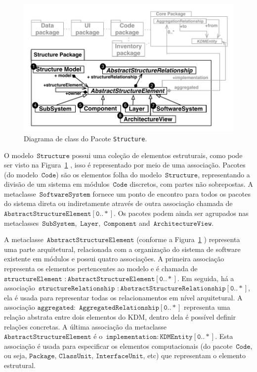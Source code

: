 \documentclass[12pt]{article}
\begin{document}
\begin{figure}[htb]
 \centering
 \includegraphics[scale=0.8]{StructurePackageFigure.pdf}
 \caption{Diagrama de class do Pacote \texttt{Structure}.}
 \label{fig:structureModel}
\end{figure}

O modelo~$\mathtt{Structure}$ possui uma coleção de elementos estruturais, como pode ser visto na Figura~\ref{fig:structureModel} , isso é representado por meio de uma associação. Pacotes (do modelo~$\mathtt{Code}$) são os elementos folha do modelo~$\mathtt{Structure}$, representando a divisão de um sistema em módulos~$\mathtt{Code}$ discretos, com partes não sobrepostas. A metaclasse~$\mathtt{SoftwareSystem}$ fornece um ponto de encontro para todos os pacotes do sistema direta ou indiretamente através de outra associação chamada de~$\mathtt{AbstractStructureElement[0..*]}$. Os pacotes podem ainda ser agrupados nas metaclasses~$\mathtt{SubSystem}$,~$\mathtt{Layer}$,~$\mathtt{Component}$ and~$\mathtt{ArchitectureView}$.

A metaclasse~$\mathtt{AbstractStructureElement}$ (conforme a Figura~\ref{fig:structureModel} ) representa uma parte arquitetural, relacionada com a organização do sistema de software existente em módulos e possui quatro associações. A primeira associação representa os elementos pertencentes ao modelo e é chamada de $\mathtt{structureElement}$ $\mathtt{:AbstractStructureElement[0..*]}$. Em seguida, há a associação~$\mathtt{structureRelationship}$ $\mathtt{:AbstractStructureRelationship[0..*]}$, ela é usada para representar todas os relacionamentos em nível arquitetural. A associação $\mathtt{aggregated:}$ $\mathtt{AggregatedRelationship[0..*]}$ representa uma relação abstrata entre dois elementos do KDM, dentro dela é possível definir relações concretas. A última associação da metaclasse~$\mathtt{AbstractStructureElement}$ é o~$\mathtt{implementation:KDMEntity[0..*]}$. Esta associação é usada para especificar os elementos computacionais (do pacote~$\mathtt{Code}$, ou seja, $\mathtt{Package}$, $\mathtt{ClassUnit}$, $\mathtt{InterfaceUnit}$, etc) que representam o elemento estrutural. 
\end{document}
